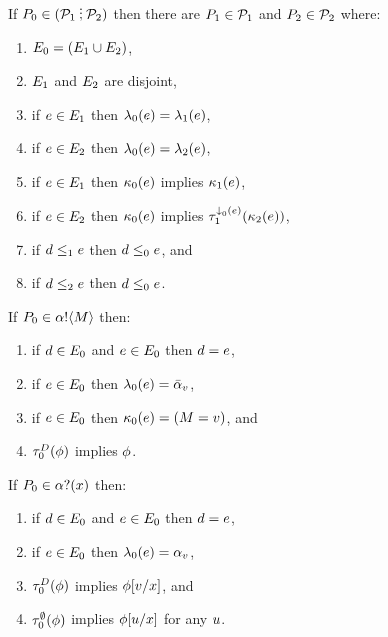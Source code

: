 \begin{definition}
  If $\aPS_0 \in (\aPSS_1\sSEMI\aPSS_2)$ then
  there are $\aPS_1\in\aPSS_1$ and $\aPS_2\in\aPSS_2$ where:
  \begin{enumerate}
  \item $\aEvs_0 = (\aEvs_1\cup\aEvs_2)$,
  \item $\aEvs_1$ and  $\aEvs_2$ are disjoint,
  \item if $\aEv\in\aEvs_1$ then $\labelingAct_0(\aEv) = \labelingAct_1(\aEv)$, 
  \item if $\aEv\in\aEvs_2$ then $\labelingAct_0(\aEv) = \labelingAct_2(\aEv)$,
  \item if $\aEv\in\aEvs_1$ then $\labelingForm_0(\aEv)$ implies $\labelingForm_1(\aEv)$, 
  \item if $\aEv\in\aEvs_2$ then $\labelingForm_0(\aEv)$ implies $\aTr[\downclose_0(e)]_1(\labelingForm_2(\aEv))$,
  \item if $\bEv\le_1\aEv$ then $\bEv\le_0\aEv$, and
  \item if $\bEv\le_2\aEv$ then $\bEv\le_0\aEv$.
  \end{enumerate}
\end{definition}

\begin{definition}
  If $\aPS_0 \in \sSEND\aChan{\aExp}$ then:
  \begin{enumerate}
  \item if $\bEv\in\aEvs_0$ and $\aEv\in\aEvs_0$ then $\bEv=\aEv$,
  \item if $\aEv\in\aEvs_0$ then $\labelingAct_0(\aEv) = \send\aChan{\aVal}$,
  \item if $\aEv\in\aEvs_0$ then $\labelingForm_0(\aEv) = (M = v)$, and
  \item $\aTr[\bEvs]_0(\aForm)$ implies $\aForm$.
  \end{enumerate}
\end{definition}

\begin{definition}
  If $\aPS_0 \in \sRECV\aChan{\aVar}$ then:
  \begin{enumerate}
  \item if $\bEv\in\aEvs_0$ and $\aEv\in\aEvs_0$ then $\bEv=\aEv$,
  \item if $\aEv\in\aEvs_0$ then $\labeling_0(\aEv) = \recv\aChan{\aVal}$,
  \item $\aTr[\bEvs]_0(\aForm)$ implies $\phi[\aVal/\aVar]$, and
  \item $\aTr[\emptyset]_0(\aForm)$ implies $\phi[\bVal/\aVar]$ for any $\bVal$.
  \end{enumerate}
\end{definition}
